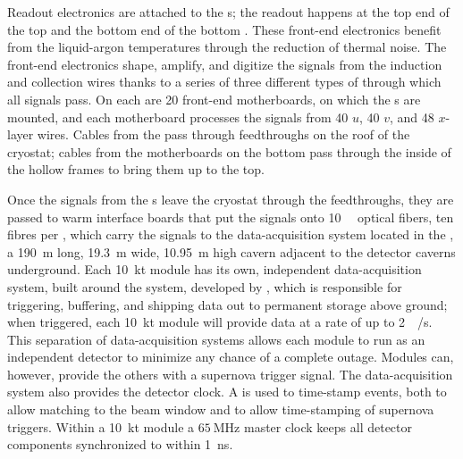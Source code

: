Readout electronics are attached to the s; the readout happens at the top end of the top  and the bottom end of the bottom . These front-end electronics benefit from the liquid-argon temperatures through the reduction of thermal noise. The front-end electronics shape, amplify, and digitize the signals from the induction and collection wires thanks to a series of three different types of  through which all signals pass. On each  are 20 front-end motherboards, on which the s are mounted, and each motherboard processes the signals from 40 $u$, 40 $v$, and 48 $x$-layer wires. Cables from the  pass through feedthroughs on the roof of the cryostat; cables from the motherboards on the bottom  pass through the inside of the hollow  frames to bring them up to the top.

Once the signals from the s leave the cryostat through the feedthroughs, they are passed to warm interface boards that put the signals onto \SI{10}{\giga\byte} optical fibers, ten fibres per , which carry the signals to the data-acquisition system located in the , a \SI{190}{\meter} long, \SI{19.3}{\meter} wide, \SI{10.95}{\meter} high cavern adjacent to the detector caverns underground. Each \SI{10}{\kilo\tonne} module has its own, independent data-acquisition system, built around the  system, developed by , which is responsible for triggering, buffering, and shipping data out to permanent storage above ground; when triggered, each \SI{10}{\kilo\tonne} module will provide data at a rate of up to \SI{2}{\tera\byte/\second}. This separation of data-acquisition systems allows each module to run as an independent detector to minimize any chance of a complete  outage. Modules can, however, provide the others with a supernova trigger signal. The data-acquisition system also provides the detector clock. A   is used to time-stamp events, both to allow matching to the beam window and to allow time-stamping of supernova triggers. Within a \SI{10}{\kilo\tonne} module a $\SI{65}{\mega\hertz}$ master clock keeps all detector components synchronized to within \SI{1}{\nano\second}.

